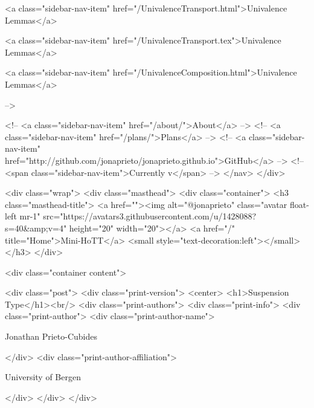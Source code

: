       
    
      
        
          <a class="sidebar-nav-item" href="/UnivalenceTransport.html">Univalence Lemmas</a>
        
      
    
      
        
          <a class="sidebar-nav-item" href="/UnivalenceTransport.tex">Univalence Lemmas</a>
        
      
    
      
        
          <a class="sidebar-nav-item" href="/UnivalenceComposition.html">Univalence Lemmas</a>
        
      
     -->

    <!-- <a class="sidebar-nav-item" href="/about/">About</a> -->
    <!-- <a class="sidebar-nav-item" href="/plans/">Plans</a> -->
    <!-- <a class="sidebar-nav-item" href="http://github.com/jonaprieto/jonaprieto.github.io">GitHub</a> -->
    <!-- <span class="sidebar-nav-item">Currently v</span> -->
  </nav>
</div>

    <div class="wrap">
      <div class="masthead">
        <div class="container">
          <h3 class="masthead-title">
            <a href=""><img alt="@jonaprieto" class="avatar float-left mr-1" src="https://avatars3.githubusercontent.com/u/1428088?s=40&amp;v=4" height="20" width="20"></a>
            <a href="/" title="Home">Mini-HoTT</a>
            <small style="text-decoration:left"></small>
          </h3>
        </div>
      
      <div class="container content">
        







<div class="post">
  <div class="print-version">
    <center>
      <h1>Suspension Type</h1><br/>
        <div class="print-authors">
          <div class="print-info">
            <div class="print-author">
              <div class="print-author-name">
                
                  Jonathan Prieto-Cubides
                
              </div>
              <div class="print-author-affiliation">
                
                  University of Bergen
                
                </div>
            </div>
          </div>
          

